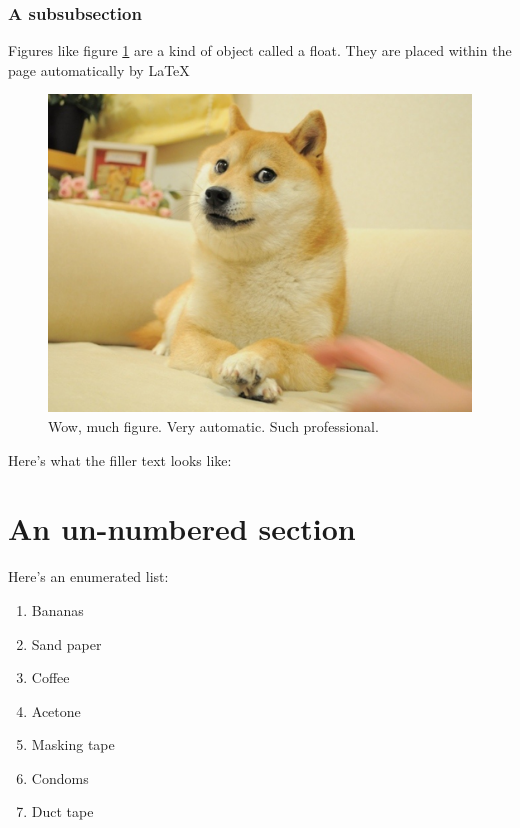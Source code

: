 \documentclass{article}
\begin{document}
\subsubsection{A subsubsection}
Figures like figure \ref{fig:doge} are a kind of object called a float. They are placed within the page automatically by \LaTeX{} 
\begin{figure}
\centering
\includegraphics[width=\linewidth]{doge.jpg}
\caption{Wow, much figure. Very automatic. Such professional.}
\label{fig:doge}
\end{figure}

Here's what the filler text looks like:
\lipsum

\section*{An un-numbered section}
\label{sec:unlab}
Here's an enumerated list:
\begin{enumerate}
\item Bananas
\item Sand paper
\item Coffee
\item Acetone
\item Masking tape
\item Condoms\label{item:condoms}
\item Duct tape
\end{enumerate}



\end{document}
